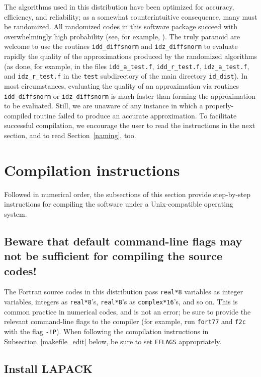 ﻿\documentclass[letterpaper,12pt]{article}
\begin{document}
The algorithms used in this distribution have been optimized
for accuracy, efficiency, and reliability;
as a somewhat counterintuitive consequence, many must be randomized.
All randomized codes in this software package succeed
with overwhelmingly high probability (see, for example,
\cite{halko-martinsson-tropp}).
The truly paranoid are welcome to use the routines {\tt idd\_diffsnorm}
and {\tt idz\_diffsnorm} to evaluate rapidly the quality
of the approximations produced by the randomized algorithms
(as done, for example, in the files
{\tt idd\_a\_test.f}, {\tt idd\_r\_test.f}, {\tt idz\_a\_test.f},
and {\tt idz\_r\_test.f} in the {\tt test} subdirectory
of the main directory {\tt id\_dist}).
In most circumstances, evaluating the quality of an approximation
via routines {\tt idd\_diffsnorm} or {\tt idz\_diffsnorm} is much faster
than forming the approximation to be evaluated. Still, we are unaware
of any instance in which a properly-compiled routine failed to produce
an accurate approximation.
To facilitate successful compilation, we encourage the user
to read the instructions in the next section,
and to read Section~\ref{naming}, too.



\section{Compilation instructions}


Followed in numerical order, the subsections of this section
provide step-by-step instructions for compiling the software
under a Unix-compatible operating system.


\subsection{Beware that default command-line flags may not be
            sufficient for compiling the source codes!}
\label{warning}

The Fortran source codes in this distribution pass {\tt real*8}
variables as integer variables, integers as {\tt real*8}'s,
{\tt real*8}'s as {\tt complex*16}'s, and so on.
This is common practice in numerical codes, and is not an error;
be sure to provide the relevant command-line flags to the compiler
(for example, run {\tt fort77} and {\tt f2c} with the flag {\tt -!P}).
When following the compilation instructions
in Subsection~\ref{makefile_edit} below,
be sure to set {\tt FFLAGS} appropriately.


\subsection{Install LAPACK}
\end{document}
